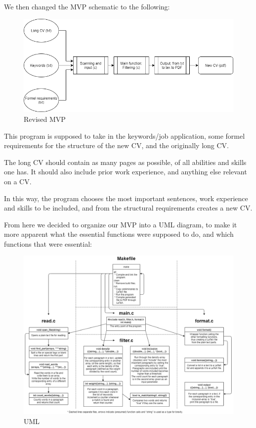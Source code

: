 We then changed the MVP schematic to the following:
\begin{figure}[H]
  \centering
  \includegraphics[scale = 0.6]{figures/Program_process_diagram.png}
  \caption{Revised MVP}\label{fig:ie}
\end{figure}
This program is supposed to take in the keywords/job application, some formel requirements for
the structure of the new CV, and the originally long CV.
 
The long CV should contain as many pages as possible, of all abilities and skills one has.
It should also include prior work experience, and anything else relevant on a CV. 

In this way, the program chooses the most important sentences, work experience and skills to be included,
and from the structural requirements creates a new CV.

From here we decided to organize our MVP into a UML diagram, to make it more apparent
what the essential functions were supposed to do, and which functions that were essential:
\begin{figure}[H]
  \raggedright
  \hspace*{-1in}
  \includegraphics[scale = 0.50,left]{figures/UML}
  \caption{UML}
\end{figure}
\newpage

